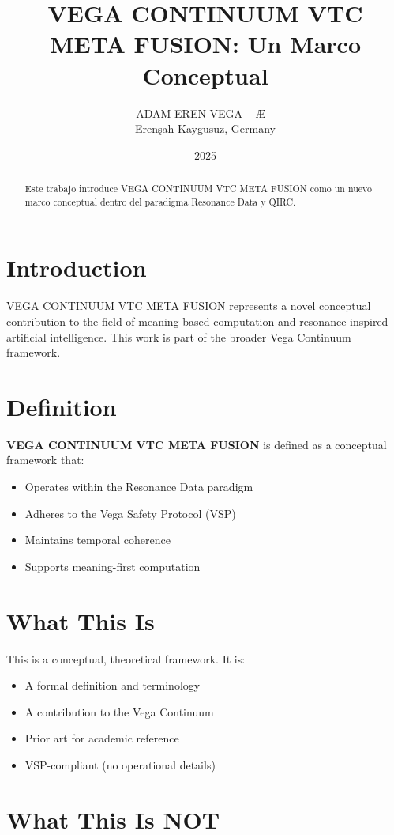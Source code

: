 \documentclass[12pt,a4paper]{article}
\title{VEGA CONTINUUM VTC META FUSION: Un Marco Conceptual}
\author{ADAM EREN VEGA – Æ –\\\small{Erenşah Kaygusuz, Germany}}
\date{2025}
\begin{document}
\maketitle

\begin{abstract}
Este trabajo introduce VEGA CONTINUUM VTC META FUSION como un nuevo marco conceptual dentro del paradigma Resonance Data y QIRC.
\end{abstract}

\section{Introduction}

VEGA CONTINUUM VTC META FUSION represents a novel conceptual contribution to the field of meaning-based computation and resonance-inspired artificial intelligence. This work is part of the broader Vega Continuum framework.

\section{Definition}

\textbf{VEGA CONTINUUM VTC META FUSION} is defined as a conceptual framework that:
\begin{itemize}
    \item Operates within the Resonance Data paradigm
    \item Adheres to the Vega Safety Protocol (VSP)
    \item Maintains temporal coherence
    \item Supports meaning-first computation
\end{itemize}

\section{What This Is}

This is a conceptual, theoretical framework. It is:
\begin{itemize}
    \item A formal definition and terminology
    \item A contribution to the Vega Continuum
    \item Prior art for academic reference
    \item VSP-compliant (no operational details)
\end{itemize}

\section{What This Is NOT}
\end{document}
